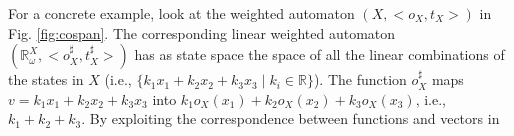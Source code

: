 \documentclass[3p]{elsarticle}
\begin{document}
For a concrete example, look at the weighted automaton
$(X,<o_X,t_X>)$ in Fig. \ref{fig:cospan}. The corresponding linear
weighted automaton
$(\mathbb{R}_{\omega}^X,<o_X^{\sharp},t_X^{\sharp}>)$ has as state
space the space of all the linear combinations of the states in $X$
(i.e., $\{k_1 x_1 + k_2 x_2 +k_3 x_3 \mid
 k_i \in \mathbb{R}\}$).
%
%
%
The function $o_X^{\sharp}$ maps $v=k_1 x_1 + k_2 x_2 +k_3 x_3$ into
$k_1 o_X(x_1) + k_2 o_X(x_2) + k_3 o_X(x_3)$, i.e., $k_1+k_2+k_3$.
By exploiting the correspondence between functions and vectors in
\end{document}
